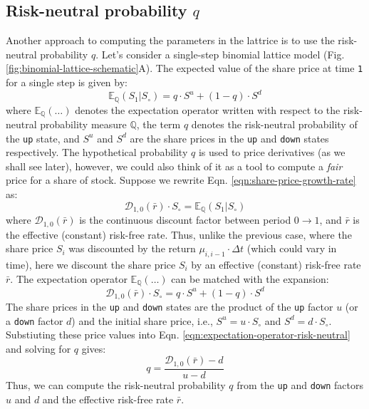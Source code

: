 \documentclass[11pt]{article}
\theoremstyle{definition}
\begin{document}
\subsection*{Risk-neutral probability $q$}
Another approach to computing the parameters in the lattrice is to use the risk-neutral probability $q$. 
Let's consider a single-step binomial lattice model (Fig. \ref{fig:binomial-lattice-schematic}A). 
The  expected value of the share price at time \texttt{1} for a single step is given by:
\begin{equation*}
	\mathbb{E}_{\mathbb{Q}}(S_{1} | S_{\circ}) = q\cdot{S^{u}} + (1-q)\cdot{S^{d}}
\end{equation*}
where $\mathbb{E}_{\mathbb{Q}}(\dots)$ denotes the expectation operator written with respect to the risk-neutral probability measure $\mathbb{Q}$, 
the term $q$ denotes the risk-neutral probability of the \texttt{up} state, and $S^{u}$ and $S^{d}$ are the share prices in the \texttt{up} and \texttt{down} states respectively.
The hypothetical probability $q$ is used to price derivatives (as we shall see later), 
however, we could also think of it as a tool to compute a \textit{fair} price for a share of stock.
Suppose we rewrite Eqn. \eqref{eqn:share-price-growth-rate} as:
\begin{equation}\label{eqn:share-price-growth-rate-2}
    \mathcal{D}_{1,0}(\bar{r})\cdot{S_{\circ}} = \mathbb{E}_{\mathbb{Q}}\left(S_{1}|S_{\circ}\right)
\end{equation}
where $\mathcal{D}_{1,0}(\bar{r})$ is the continuous discount factor between period $0\rightarrow{1}$, 
and $\bar{r}$ is the effective (constant) risk-free rate. Thus, unlike the previous case, where the share price $S_{i}$ was discounted by the
return $\mu_{i,i-1}\cdot\Delta{t}$ (which could vary in time), here we discount the share price $S_{i}$ by an effective (constant) risk-free rate $\bar{r}$.
The expectation operator $\mathbb{E}_{\mathbb{Q}}(\dots)$ can be matched with the expansion:
\begin{equation}\label{eqn:expectation-operator-risk-neutral}
\mathcal{D}_{1,0}(\bar{r})\cdot{S_{\circ}} = q\cdot{S^{u}} + (1-q)\cdot{S^{d}}
\end{equation}
The share prices in the \texttt{up} and \texttt{down} states are the product of the \texttt{up} factor $u$ (or a \texttt{down} factor $d$) and the initial share price, 
i.e., $S^{u} = u\cdot{S_{\circ}}$ and $S^{d} = d\cdot{S_{\circ}}$. Substiuting these price values into Eqn. \eqref{eqn:expectation-operator-risk-neutral} and solving for $q$ gives:
\begin{equation}\label{eqn:risk-neutral-probability}
q = \frac{\mathcal{D}_{1,0}(\bar{r}) - d}{u - d}
\end{equation}
Thus, we can compute the risk-neutral probability $q$ from the \texttt{up} and \texttt{down} factors $u$ and $d$ and the effective risk-free rate $\bar{r}$.
\end{document}
